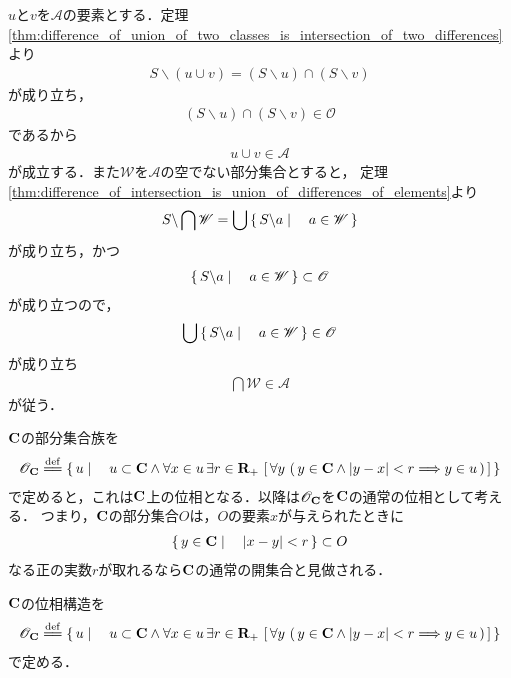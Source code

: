 	\begin{sketch}
		$u$と$v$を$\mathscr{A}$の要素とする．定理\ref{thm:difference_of_union_of_two_classes_is_intersection_of_two_differences}より
		\begin{align}
			S \backslash (u \cup v) = (S \backslash u) \cap (S \backslash v)
		\end{align}
		が成り立ち，
		\begin{align}
			(S \backslash u) \cap (S \backslash v) \in \mathscr{O}
		\end{align}
		であるから
		\begin{align}
			u \cup v \in \mathscr{A}
		\end{align}
		が成立する．また$\mathscr{W}$を$\mathscr{A}$の空でない部分集合とすると，
		定理\ref{thm:difference_of_intersection_is_union_of_differences_of_elements}より
		\begin{align}
			S \backslash \bigcap \mathscr{W} = \bigcup \left\{\, S \backslash a \mid \quad a \in \mathscr{W}\, \right\}
		\end{align}
		が成り立ち，かつ
		\begin{align}
			\left\{\, S \backslash a \mid \quad a \in \mathscr{W}\, \right\} \subset \mathscr{O}
		\end{align}
		が成り立つので，
		\begin{align}
			\bigcup \left\{\, S \backslash a \mid \quad a \in \mathscr{W}\, \right\} \in \mathscr{O}
		\end{align}
		が成り立ち
		\begin{align}
			\bigcap \mathscr{W} \in \mathscr{A}
		\end{align}
		が従う．
		\QED
	\end{sketch}
	
	$\C$の部分集合族を
	\begin{align}
		\mathscr{O}_\C \defeq \Set{u}{u \subset \C \wedge \forall x \in u\, \exists r \in \R_+\, 
				\left[\, \forall y\, \left(\, y \in \C \wedge |y-x| < r \Longrightarrow y \in u\, \right)\, \right]}
	\end{align}
	で定めると，これは$\C$上の位相となる．以降は$\mathscr{O}_{\mathbf{C}}$を$\C$の通常の位相として考える．
	つまり，$\C$の部分集合$O$は，$O$の要素$x$が与えられたときに
	\begin{align}
		\left\{\, y \in \mathbf{C} \mid \quad |x-y| < r\, \right\} \subset O
	\end{align}
	なる正の実数$r$が取れるなら$\C$の通常の開集合と見做される．
	
	\begin{screen}
		\begin{dfn}[$\C$の位相]
			$\C$の位相構造を
			\begin{align}
				\mathscr{O}_\C \defeq \Set{u}{u \subset \C \wedge \forall x \in u\, \exists r \in \R_+\, 
				\left[\, \forall y\, \left(\, y \in \C \wedge |y-x| < r \Longrightarrow y \in u\, \right)\, \right]}
			\end{align}
			で定める．
		\end{dfn}
	\end{screen}
	

